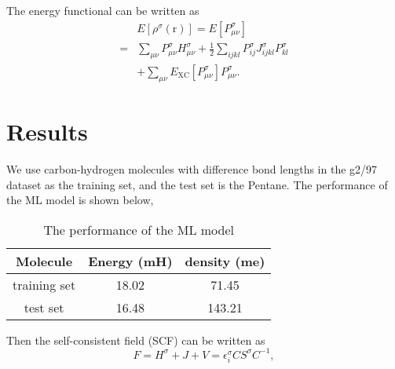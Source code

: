 \documentclass[%
twocolumn,
amsmath,amssymb,
groupedaddress,
reprint,%
]{revtex4-2}
\renewcommand{\>}{\rangle}
\newcommand{\<}{\langle}
\newcommand{\nl}{\nonumber \\}
\newcommand{\XC}{\mathrm{XC}}
\newcommand{\brm}[1]{\bm{\mathrm{#1}}}
\begin{document}
The energy functional can be written as
\begin{align}
      & E[\rho^{{\sigma}}(\brm{r})] = E[P^{\sigma}_{\mu \nu}] \nl
    = & \sum_{\mu \nu} P^{\sigma}_{\mu \nu} H^{\sigma}_{\mu \nu} + \frac{1}{2} \sum_{ijkl} P^{\sigma}_{ij} J^{\sigma}_{ijkl} P^{\sigma}_{kl}  \nl
      & + \sum_{\mu \nu}  E_{\XC}[P^{\sigma}_{\mu \nu}] P^{\sigma}_{\mu \nu}.
\end{align}

\section{Results}
We use carbon-hydrogen molecules with difference bond lengths in the g2/97 dataset as the training set, and the test set is the Pentane.
%
The performance of the ML model is shown below,
\begin{table}[h]
    \centering
    \begin{tabular}{c|c|c}
        \hline
        Molecule     & Energy (mH) & density (me) \\
        \hline
        training set & 18.02       & 71.45        \\
        test set     & 16.48       & 143.21       \\
        \hline
    \end{tabular}
    \caption{The performance of the ML model}
\end{table}

Then the self-consistent field (SCF) can be written as
\begin{equation}
    F = H^{\sigma} + J + V = \epsilon^{\sigma}_{i} C S^{\sigma} C^{-1},
\end{equation}
\end{document}
